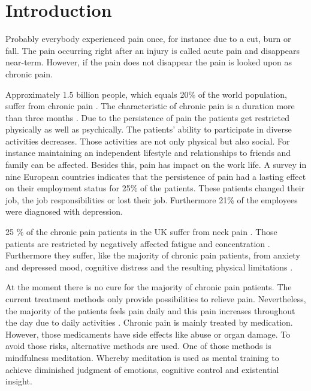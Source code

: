 \chapter{Introduction}
Probably everybody experienced pain once, for instance due to a cut, burn or fall. The pain occurring right after an injury is called acute pain and disappears near-term. However, if the pain does not disappear the pain is looked upon as chronic pain. \cite{Briggs2010,Mello2016}

Approximately 1.5 billion people, which equals 20\% of the world population, suffer from chronic pain \cite{Zeidan2016,Macfarlanea2016}. The characteristic of chronic pain is a duration more than three months \cite{Mello2016}. Due to the persistence of pain the patients get restricted physically as well as psychically. 
The patients' ability to participate in diverse activities decreases. Those activities are not only physical but also social. For instance maintaining an independent lifestyle and relationships to friends and family can be affected. Besides this, pain has impact on the work life. A survey in nine European countries  indicates that the persistence of pain had a lasting effect on their employment status for 25\% of the patients. These patients changed their job, the job responsibilities or lost their job. Furthermore  21\% of the employees were diagnosed with depression. \cite{Breivik2006} 

25 \% of the chronic pain patients in the UK suffer from neck pain \cite{Macfarlanea2016}. Those patients are restricted by negatively affected fatigue and concentration \cite{vanRanderaat2016}. Furthermore they suffer, like the majority of chronic pain patients, from anxiety and depressed mood, cognitive distress and the resulting physical limitations \cite{gross2013}.

At the moment there is no cure for the majority of chronic pain patients. The current treatment methods only provide possibilities to relieve pain. \cite{marcus2009,pope2017} Nevertheless, the majority of the patients feels pain daily and this pain increases throughout the day due to daily activities \cite{Breivik2006}.
Chronic pain is mainly treated by medication. However, those medicaments have side effects like abuse or organ damage. To avoid those risks, alternative methods are used. One of those methods is mindfulness meditation. Whereby meditation is used as mental training to achieve diminished judgment of emotions, cognitive control and existential insight. \cite{Zeidan2012}

